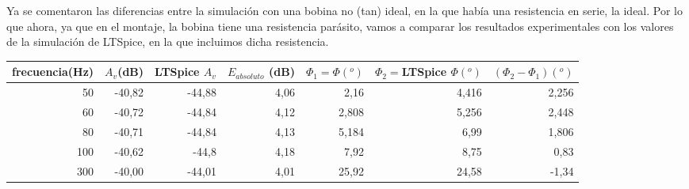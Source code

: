 \documentclass{article}
\begin{document}
Ya se comentaron las diferencias entre la simulación con una bobina no (tan) ideal, en la que había una resistencia en serie, la ideal. Por lo que ahora, ya que en el montaje, la bobina tiene una resistencia parásito, vamos a comparar los resultados experimentales con los valores de la simulación de LTSpice, en la que incluimos dicha resistencia. 
\cleardoublepage
\begin{table}[h!]
\centering
\begin{tabular}{|r|r|r|r|r|r|r|}
\hline
\multicolumn{1}{|l|}{frecuencia(Hz)} & \multicolumn{1}{l|}{$A_v$(dB)} & \multicolumn{1}{l|}{LTSpice $A_v$} & \multicolumn{1}{l|}{$E_{absoluto}$ (dB)} & \multicolumn{1}{l|}{$\Phi_1=\Phi (^o)$} & \multicolumn{1}{l|}{$\Phi_2=$LTSpice $\Phi (^o)$} & \multicolumn{1}{l|}{$(\Phi_2 - \Phi_1)(^o)$} \\ \hline
50                                   & -40,82                                              & -44,88                             & 4,06                                     & 2,16                             & 4,416                                    & 2,256                                                                                       \\ \hline
60                                   & -40,72                                              & -44,84                             & 4,12                                     & 2,808                            & 5,256                                    & 2,448                                                                                       \\ \hline
80                                   & -40,71                                              & -44,84                             & 4,13                                     & 5,184                            & 6,99                                     & 1,806                                                                                       \\ \hline
100                                  & -40,62                                              & -44,8                              & 4,18                                     & 7,92                             & 8,75                                     & 0,83                                                                                        \\ \hline
300                                  & -40,00                                              & -44,01                             & 4,01                                     & 25,92                            & 24,58                                    & -1,34                                                                                       \\ \hline

\end{tabular}
\end{table}
\end{document}
